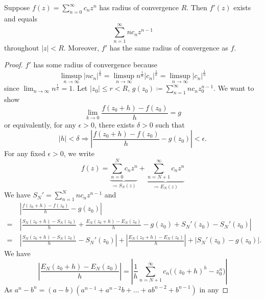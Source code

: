 \documentclass[11pt]{article}
\begin{document}
\begin{theorem}
	Suppose $f(z) = \sum^\infty_{n=0}c_nz^n$ has radius of
	convergence $R$. Then $f'(z)$ exists and equals
	\begin{equation*}
		\sum^{\infty}_{n=1} nc_nz^{n-1}
	\end{equation*}
	throughout $|z| < R$. Moreover, $f'$ has the same radius of convergence as
	$f$.
	\label{theorem4}
\end{theorem}
\begin{proof}
	$f'$ has some radius of convergence because
	\begin{equation*}
		\limsup_{n\to\infty}|nc_n|^{\frac{1}{n}}
		= \limsup_{n\to\infty}n^{\frac{1}{n}}|c_n|^{\frac{1}{n}}
		= \limsup_{n\to\infty}|c_n|^{\frac{1}{n}}
	\end{equation*}
	since $\displaystyle\lim_{n\to\infty}n^{\frac{1}{n}} = 1$. Let $|z_0| \leq r
	< R$, $\displaystyle g(z_0) \coloneqq \sum^\infty_{n=1} nc_nz_0^{n-1}$. We
	want to show
	\begin{equation*}
		\lim_{k\to 0} \frac{f(z_0+h) - f(z_0)}{h} = g
	\end{equation*}
	or equivalently, for any $\epsilon > 0$, there exists $\delta > 0$ such that
	\begin{equation*}
		|h| < \delta \Rightarrow \left|\frac{f(z_0+h) - f(z_0)}{h} -
		g(z_0)\right| < \epsilon.
	\end{equation*}
	For any fixed $\epsilon > 0$, we write
	\begin{equation*}
		f(z) = \underbrace{\sum^N_{n=0}c_nz^n}_{\coloneqq S_N(z)} +
		\underbrace{\sum^\infty_{n=N+1}c_nz^n}_{\coloneqq E_N(z)}
	\end{equation*}
	We have $S_N' = \sum^N_{n=1}nc_nz^{n-1}$ and
	\begin{align*}
		&\>\left|\frac{f(z_0+h) - f(z_0)}{h} - g(z_0)\right|\\
		=&\> \left|\frac{S_N(z_0+h) - S_N(z_0)}{h} + \frac{E_N(z_0+h) -
		E_N(z_0)}{h} - g(z_0) + S_N'(z_0) -S_N'(z_0)\right|\\
		=&\> \left|\frac{S_N(z_0+h) - S_N(z_0)}{h} - S_N'(z_0) \right|
		+ \left|\frac{E_N(z_0+h) - E_N(z_0)}{h}\right| + \left|S_N'(z_0) -
		g(z_0)\right|.
	\end{align*}
	We have
	\begin{equation*}
		\left|\frac{E_N(z_0+h) - E_N(z_0)}{h}\right| = \left|\frac{1}{h}
		\sum^\infty_{n=N+1}c_n \big((z_0+h)^h -z_0^n\big)\right|
	\end{equation*}
	As $a^n -b^n = (a-b)(a^{n-1} + a^{n-2}b + \dots+ab^{n-2} + b^{n-1})$ in any

\end{proof}
\end{document}
